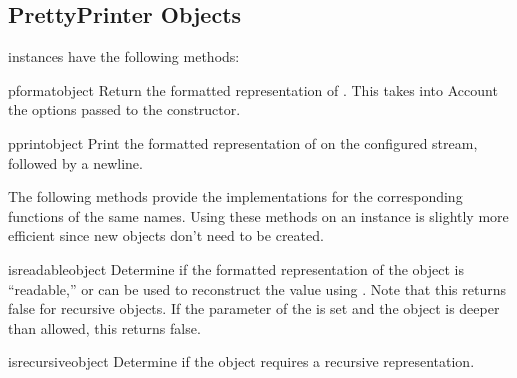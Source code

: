 \subsection{PrettyPrinter Objects}
\label{PrettyPrinter Objects}

 instances have the following methods:


\begin{methoddesc}{pformat}{object}
Return the formatted representation of .  This takes into
Account the options passed to the  constructor.
\end{methoddesc}

\begin{methoddesc}{pprint}{object}
Print the formatted representation of  on the configured
stream, followed by a newline.
\end{methoddesc}

The following methods provide the implementations for the
corresponding functions of the same names.  Using these methods on an
instance is slightly more efficient since new 
objects don't need to be created.

\begin{methoddesc}{isreadable}{object}
Determine if the formatted representation of the object is
``readable,'' or can be used to reconstruct the value using
.  Note that this returns false for
recursive objects.  If the  parameter of the
 is set and the object is deeper than allowed,
this returns false.
\end{methoddesc}

\begin{methoddesc}{isrecursive}{object}
Determine if the object requires a recursive representation.
\end{methoddesc}
